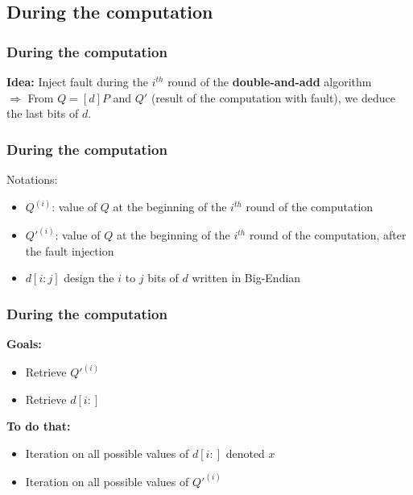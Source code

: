 \documentclass{beamer}
\begin{document}
    \subsection{During the computation}
    \begin{frame}
        \frametitle{During the computation}
        {\bf Idea: } Inject fault during the $i^{th}$ round of the {\bf double-and-add} algorithm \\

        $\Rightarrow$ From $Q = [d]P$ and $Q'$ (result of the computation with fault), we deduce the last bits of $d$.

    \end{frame}
    
    \begin{frame}
        \frametitle{During the computation}
        Notations:
        \begin{itemize}
            \item \color {black} { $Q^{(i)}$: value of $Q$ at the beginning of the $i^{th}$ round of the computation }
            \item \color {black} { $Q'^{(i)}$: value of $Q$ at the beginning of the $i^{th}$ round of the computation, after the fault injection }
            \item \color {black} { $d[i:j]$ design the $i$ to $j$ bits of $d$ written in Big-Endian }
        \end{itemize}

    \end{frame}
    
    \begin{frame}
        \frametitle{During the computation}
       
        {\bf Goals:}
        \begin{itemize}
            \item \color{black} { Retrieve $Q'^{(i)}$}
            \item \color{black} { Retrieve $d[i:]$ }
        \end{itemize}

        {\bf To do that:}
        \begin{itemize}
            \item \color{black} { Iteration on all possible values of $d[i:]$ denoted $x$}
            \item \color{black} { Iteration on all possible values of $Q'^{(i)}$}
        \end{itemize}
    \end{frame}
    
\end{document}

